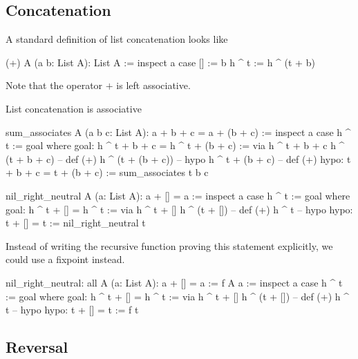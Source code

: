 \subsection{Concatenation}


A standard definition of list concatenation looks like

\begin{alba}
  (+) A (a b: List A): List A :=
    inspect a case
      [] :=
        b
      h ^ t :=
        h ^ (t + b)
\end{alba}
Note that the operator $+$ is left associative.


List concatenation is associative
%
\begin{alba}
  sum_associates A (a b c: List A): a + b + c = a + (b + c) :=
    inspect a case
      h ^ t :=
        goal where
          goal: h ^ t + b + c = h ^ t + (b + c) :=
            via
               h ^ t + b + c
               h ^ (t + b + c)      -- def (+)
               h ^ (t + (b + c))    -- hypo
               h ^ t + (b + c)      -- def (+)
          hypo: t + b + c = t + (b + c) :=
            sum_associates t b c
\end{alba}


\begin{alba}
  nil_right_neutral A (a: List A): a + [] = a :=
    inspect a case
      h ^ t :=
        goal where
          goal: h ^ t + [] = h ^ t :=
            via
              h ^ t + []
              h ^ (t + [])   -- def (+)
              h ^ t          -- hypo
          hypo: t + [] = t :=
            nil_right_neutral t
\end{alba}

Instead of writing the recursive function proving this statement explicitly,
we could use a fixpoint instead.

\begin{alba}
  nil_right_neutral: all A (a: List A): a + [] = a :=
    f A a :=
      inspect a case
        h ^ t :=
          goal where
            goal: h ^ t + [] = h ^ t :=
              via
                h ^ t + []
                h ^ (t + [])   -- def (+)
                h ^ t          -- hypo
            hypo: t + [] = t :=
              f t
\end{alba}



\subsection{Reversal}



